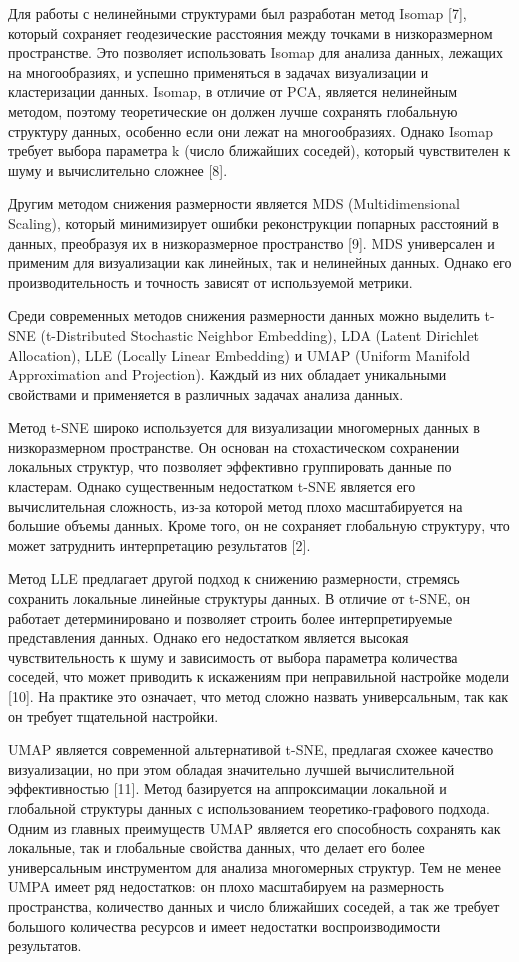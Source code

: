 \documentclass[a4paper,12pt]{extarticle}
\begin{document}
Для работы с нелинейными структурами был разработан метод Isomap [7], который сохраняет геодезические расстояния между точками в низкоразмерном пространстве. Это позволяет использовать Isomap для анализа данных, лежащих на многообразиях, и успешно применяться в задачах визуализации и кластеризации данных. Isomap, в отличие от PCA, является нелинейным методом, поэтому теоретические он должен лучше сохранять глобальную структуру данных, особенно если они лежат на многообразиях. Однако Isomap требует выбора параметра k (число ближайших соседей), который чувствителен к шуму и вычислительно сложнее [8].

Другим методом снижения размерности является MDS (Multidimensional Scaling), который минимизирует ошибки реконструкции попарных расстояний в данных, преобразуя их в низкоразмерное пространство [9]. MDS универсален и применим для визуализации как линейных, так и нелинейных данных. Однако его производительность и точность зависят от используемой метрики.

Среди современных методов снижения размерности данных можно выделить t-SNE (t-Distributed Stochastic Neighbor Embedding), LDA (Latent Dirichlet Allocation), LLE (Locally Linear Embedding) и UMAP (Uniform Manifold Approximation and Projection). Каждый из них обладает уникальными свойствами и применяется в различных задачах анализа данных.

Метод t-SNE широко используется для визуализации многомерных данных в низкоразмерном пространстве. Он основан на стохастическом сохранении локальных структур, что позволяет эффективно группировать данные по кластерам. Однако существенным недостатком t-SNE является его вычислительная сложность, из-за которой метод плохо масштабируется на большие объемы данных. Кроме того, он не сохраняет глобальную структуру, что может затруднить интерпретацию результатов [2].

Метод LLE предлагает другой подход к снижению размерности, стремясь сохранить локальные линейные структуры данных. В отличие от t-SNE, он работает детерминировано и позволяет строить более интерпретируемые представления данных. Однако его недостатком является высокая чувствительность к шуму и зависимость от выбора параметра количества соседей, что может приводить к искажениям при неправильной настройке модели [10]. На практике это означает, что метод сложно назвать универсальным, так как он требует тщательной настройки.

UMAP является современной альтернативой t-SNE, предлагая схожее качество визуализации, но при этом обладая значительно лучшей вычислительной эффективностью [11]. Метод базируется на аппроксимации локальной и глобальной структуры данных с использованием теоретико-графового подхода. Одним из главных преимуществ UMAP является его способность сохранять как локальные, так и глобальные свойства данных, что делает его более универсальным инструментом для анализа многомерных структур. Тем не менее UMPA имеет ряд недостатков: он плохо масштабируем на размерность пространства, количество данных и число ближайших соседей, а так же требует большого количества ресурсов и имеет недостатки воспроизводимости результатов.
\end{document}
